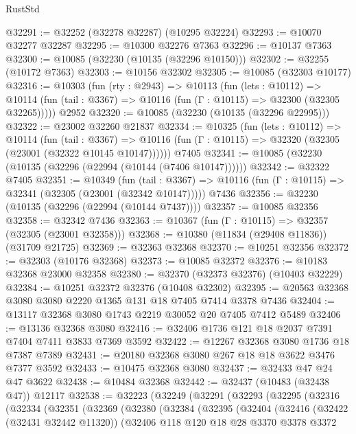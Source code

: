\begin{lexlean}{RustStd}
\begin{coremodule}
@32291 := @32252 (@32278 @32287) (@10295 @32224)
@32293 := @10070 @32277 @32287
@32295 := @10300 @32276 @7363
@32296 := @10137 @7363
@32300 := @10085 (@32230 (@10135 (@32296 @10150)))
@32302 := @32255 (@10172 @7363)
@32303 := @10156 @32302
@32305 := @10085 (@32303 @10177)
@32316 := @10303
    (fun (rty : @2943) =>
    @10113
      (fun (lets : @10112) =>
      @10114 (fun (tail : @3367) => @10116 (fun (Γ : @10115) => @32300 (@32305 @32265)))))
    @2952
@32320 := @10085 (@32230 (@10135 (@32296 @22995)))
@32322 := @23002 @32260 @21837
@32334 := @10325
    (fun (lets : @10112) =>
    @10114
      (fun (tail : @3367) =>
      @10116 (fun (Γ : @10115) => @32320 (@32305 (@23001 (@32322 @10145 @10147))))))
    @7405
@32341 := @10085 (@32230 (@10135 (@32296 (@22994 (@10144 (@7406 @10147))))))
@32342 := @32322 @7405
@32351 := @10349
    (fun (tail : @3367) => @10116 (fun (Γ : @10115) => @32341 (@32305 (@23001 (@32342 @10147)))))
    @7436
@32356 := @32230 (@10135 (@32296 (@22994 (@10144 @7437))))
@32357 := @10085 @32356
@32358 := @32342 @7436
@32363 := @10367 (fun (Γ : @10115) => @32357 (@32305 (@23001 @32358)))
@32368 := @10380 (@11834 (@29408 @11836)) (@31709 @21725)
@32369 := @32363 @32368
@32370 := @10251 @32356
@32372 := @32303 (@10176 @32368)
@32373 := @10085 @32372
@32376 := @10183 @32368 @23000 @32358
@32380 := @32370 (@32373 @32376) (@10403 @32229)
@32384 := @10251 @32372 @32376 (@10408 @32302)
@32395 := @20563 @32368 @3080 @3080 @2220 @1365 @131 @18 @7405 @7414 @3378 @7436
@32404 := @13117 @32368 @3080 @1743 @2219 @30052 @20 @7405 @7412 @5489
@32406 := @13136 @32368 @3080
@32416 := @32406 @1736 @121 @18 @2037 @7391 @7404 @7411 @3833 @7369 @3592
@32422 := @12267 @32368 @3080 @1736 @18 @7387 @7389
@32431 := @20180 @32368 @3080 @267 @18 @18 @3622 @3476 @7377 @3592
@32433 := @10475 @32368 @3080
@32437 := @32433 @47 @24 @47 @3622
@32438 := @10484 @32368
@32442 := @32437 (@10483 (@32438 @47)) @12117
@32538 := @32223
    (@32249
      (@32291
        (@32293
          (@32295
            (@32316
              (@32334
                (@32351
                  (@32369
                    (@32380
                      (@32384
                        (@32395
                          (@32404
                            (@32416
                              (@32422 (@32431 @32442 @11320))
                              (@32406
                                @118
                                @120
                                @18
                                @28
                                @3370
                                @3378
                                @3372

\end{coremodule}
\end{lexlean}
